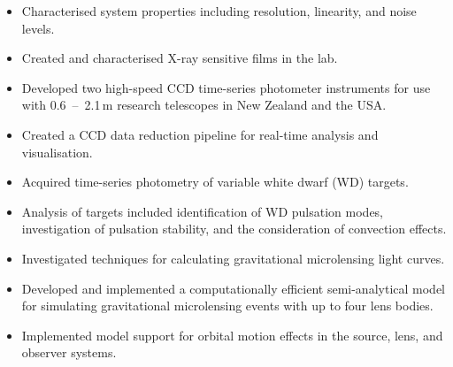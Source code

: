 \documentclass[print]{cv-style}
\begin{document}
\begin{entrylist}
{\begin{itemize}
    \item Characterised system properties including resolution, linearity, and noise levels.
    \item Created and characterised X-ray sensitive films in the lab.
  \end{itemize}
}
  {
\begin{itemize}
    \item Developed two high-speed CCD time-series photometer instruments for use with \mbox{0.6~--~2.1\,m} research telescopes in New Zealand and the USA.
    \item Created a CCD data reduction pipeline for real-time analysis and visualisation.
    \item Acquired time-series photometry of variable white dwarf (WD) targets.
    \item Analysis of targets included identification of WD pulsation modes, investigation of pulsation stability, and the consideration of convection effects.
\end{itemize}}
  {
\begin{itemize}
    \item Investigated techniques for calculating gravitational microlensing light curves.
    \item Developed and implemented a computationally efficient semi-analytical model for simulating gravitational microlensing events with up to four lens bodies.
    \item Implemented model support for orbital motion effects in the source, lens, and observer systems.
  \end{itemize}}
\end{entrylist}
\end{document}
